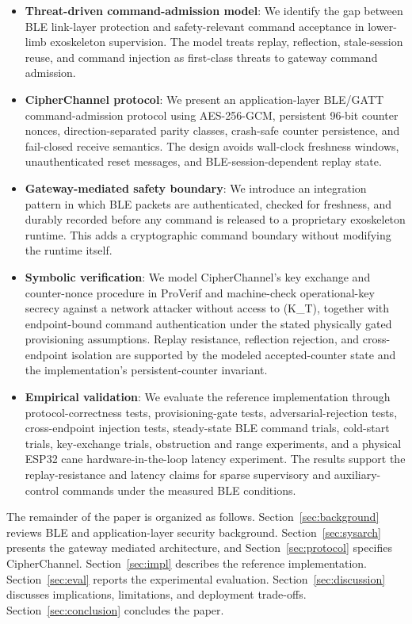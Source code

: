 \documentclass[journal]{IEEEtran}
\begin{document}
\begin{itemize}
\item \textbf{Threat-driven command-admission model}: We identify the gap between BLE link-layer protection and safety-relevant command acceptance in lower-limb exoskeleton supervision. The model treats replay, reflection, stale-session reuse, and command injection as first-class threats to gateway command admission.

\item \textbf{CipherChannel protocol}: We present an application-layer BLE/GATT command-admission protocol using AES-256-GCM, persistent 96-bit counter nonces, direction-separated parity classes, crash-safe counter persistence, and fail-closed receive semantics. The design avoids wall-clock freshness windows, unauthenticated reset messages, and BLE-session-dependent replay state.

\item \textbf{Gateway-mediated safety boundary}: We introduce an integration pattern in which BLE packets are authenticated, checked for freshness, and durably recorded before any command is released to a proprietary exoskeleton runtime. This adds a cryptographic command boundary without modifying the runtime itself.

\item \textbf{Symbolic verification}: We model CipherChannel's key exchange and counter-nonce procedure in ProVerif and machine-check operational-key secrecy against a network attacker without access to (K\_T), together with endpoint-bound command authentication under the stated physically gated provisioning assumptions. Replay resistance, reflection rejection, and cross-endpoint isolation are supported by the modeled accepted-counter state and the implementation's persistent-counter invariant.

\item \textbf{Empirical validation}: We evaluate the reference implementation through protocol-correctness tests, provisioning-gate tests, adversarial-rejection tests, cross-endpoint injection tests, steady-state BLE command trials, cold-start trials, key-exchange trials, obstruction and range experiments, and a physical ESP32 cane hardware-in-the-loop latency experiment. The results support the replay-resistance and latency claims for sparse supervisory and auxiliary-control commands under the measured BLE conditions.
\end{itemize}

The remainder of the paper is organized as follows. Section~\ref{sec:background} reviews BLE and application-layer security background. Section~\ref{sec:sysarch} presents the gateway mediated architecture, and Section~\ref{sec:protocol} specifies CipherChannel. Section~\ref{sec:impl} describes the reference implementation. Section~\ref{sec:eval} reports the experimental evaluation. Section~\ref{sec:discussion} discusses implications, limitations, and deployment trade-offs. Section~\ref{sec:conclusion} concludes the paper.
\end{document}
